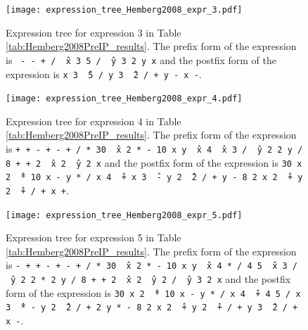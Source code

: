 \documentclass[12pt]{iopart}
\begin{document}
\begin{figure}
    \centering
    \texttt{[image: expression\_tree\_Hemberg2008\_expr\_3.pdf]}
    \caption{Expression tree for expression 3 in Table \ref{tab:Hemberg2008PreIP_results}. The prefix form of the expression is \texttt{ - - + / \^\ x 3 5 / \^\ y 3 2 y x} and the postfix form of the expression is \texttt{x 3 \^\ 5 / y 3 \^\ 2 / + y - x -}. } 
    \label{fig:expression_tree_Hemberg2008_expr_3}
\end{figure}

\begin{figure}
    \centering
    \texttt{[image: expression\_tree\_Hemberg2008\_expr\_4.pdf]}
    \caption{Expression tree for expression 4 in Table \ref{tab:Hemberg2008PreIP_results}.  The prefix form of the expression is \texttt{+ + - + - + / * 30 \^\ x 2 * - 10 x y \^\ x 4 \^\ x 3 / \^\ y 2 2 y / 8 + + 2 \^\ x 2 \^\ y 2 x} and the postfix form of the expression is \texttt{30 x 2 \^\ * 10 x - y * / x 4 \^\ + x 3 \^\ - y 2 \^\ 2 / + y - 8 2 x 2 \^\ + y 2 \^\ + / + x +}. } 
    \label{fig:expression_tree_Hemberg2008_expr_4}
\end{figure}

\begin{figure}
    \centering
    \texttt{[image: expression\_tree\_Hemberg2008\_expr\_5.pdf]}
    \caption{Expression tree for expression 5 in Table \ref{tab:Hemberg2008PreIP_results}. The prefix form of the expression is \texttt{- + + - + - + / * 30 \^\ x 2 * - 10 x y \^\ x 4 * / 4 5 \^\ x 3 / \^\ y 2 2 * 2 y / 8 + + 2 \^\ x 2 \^\ y 2 / \^\ y 3 2 x} and the postfix form of the expression is \texttt{30 x 2 \^\ * 10 x - y * / x 4 \^\ + 4 5 / x 3 \^\ * - y 2 \^\ 2 / + 2 y * - 8 2 x 2 \^\ + y 2 \^\ + / + y 3 \^\ 2 / + x -}. } 
    \label{fig:expression_tree_Hemberg2008_expr_5}
\end{figure}
\end{document}
